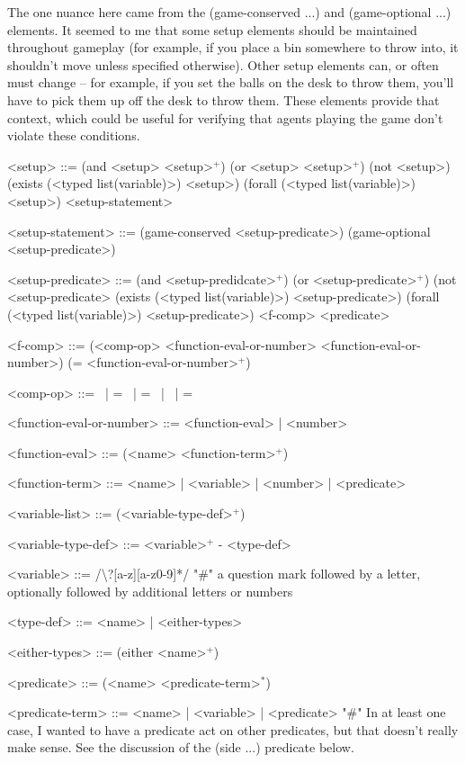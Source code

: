 \documentclass{article}
\begin{document}
        The one nuance here came from the (game-conserved ...) and (game-optional ...) elements. It seemed to me that some setup elements should be maintained
        throughout gameplay (for example, if you place a bin somewhere to throw into, it shouldn't move unless specified otherwise).
        Other setup elements can, or often must change -- for example, if you set the balls on the desk to throw them, you'll have to pick them up off the desk to throw them.
        These elements provide that context, which could be useful for verifying that agents playing the game don't violate these conditions.
        
\begin{grammar}
<setup> ::= (and <setup> <setup>$^+$) \alt
    (or <setup> <setup>$^+$) \alt
    (not <setup>) \alt
    (exists (<typed list(variable)>) <setup>) \alt
    (forall (<typed list(variable)>) <setup>) \alt
    <setup-statement>

<setup-statement> ::= (game-conserved <setup-predicate>) \alt
    (game-optional <setup-predicate>)

<setup-predicate> ::= (and <setup-predidcate>$^+$) \alt
    (or <setup-predicate>$^+$) \alt
    (not <setup-predicate> \alt
    (exists (<typed list(variable)>) <setup-predicate>) \alt
    (forall (<typed list(variable)>) <setup-predicate>) \alt
    <f-comp> \alt
    <predicate>


<f-comp> ::= (<comp-op> <function-eval-or-number> <function-eval-or-number>) \alt
    (= <function-eval-or-number>$^+$)
    
<comp-op> ::=  \textlangle \ | \textlangle = \ | = \ | \textrangle \ | \textrangle =

<function-eval-or-number> ::= <function-eval> | <number>

<function-eval> ::= (<name> <function-term>$^+$)

<function-term> ::= <name> | <variable> | <number> | <predicate>

<variable-list> ::= (<variable-type-def>$^+$)

<variable-type-def> ::= <variable>$^+$ - <type-def>

<variable> ::= /\textbackslash?[a-z][a-z0-9]*/  "#" a question mark followed by a letter, optionally followed by additional letters or numbers

<type-def> ::= <name> | <either-types>

<either-types> ::= (either <name>$^+$)

<predicate> ::= (<name> <predicate-term>$^*$)

<predicate-term> ::= <name> | <variable> | <predicate> "#" In at least one case, I wanted to have a predicate act on other predicates, but that doesn't really make sense. See the discussion of the (side ...) predicate below.


\end{grammar}
\end{document}
